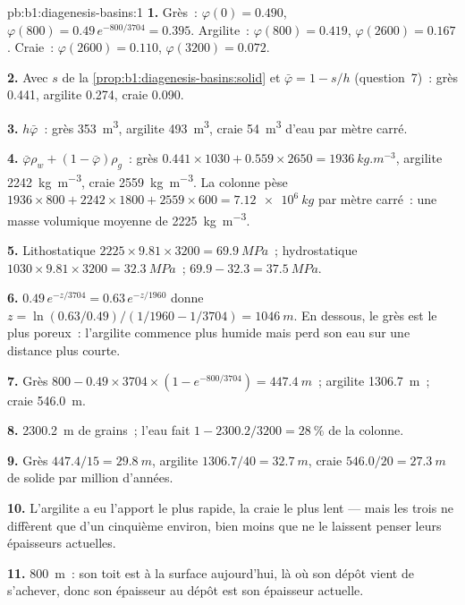 \begin{solution}{pb:b1:diagenesis-basins:1}
\textbf{1.} Grès~: $\varphi(0) = \num{0.490}$, $\varphi(800) =
0.49\,e^{-800/3704} = \num{0.395}$. Argilite~: $\varphi(800) = \num{0.419}$,
$\varphi(2600) = \num{0.167}$. Craie~: $\varphi(2600) = \num{0.110}$,
$\varphi(3200) = \num{0.072}$.

\textbf{2.} Avec $s$ de la \cref{prop:b1:diagenesis-basins:solid} et $\bar\varphi
= 1 - s/h$ (question~7)~: grès \num{0.441}, argilite \num{0.274}, craie
\num{0.090}.

\textbf{3.} $h\bar\varphi$~: grès \qty{353}{m^3}, argilite \qty{493}{m^3}, craie
\qty{54}{m^3} d'eau par mètre carré.

\textbf{4.} $\bar\varphi\rho_w + (1 - \bar\varphi)\rho_g$~: grès
$0.441\times1030 + 0.559\times2650 = \qty{1936}{kg.m^{-3}}$, argilite
\qty{2242}{kg.m^{-3}}, craie \qty{2559}{kg.m^{-3}}. La colonne pèse
$1936\times800 + 2242\times1800 + 2559\times600 = \qty{7.12e6}{kg}$ par mètre
carré~: une masse volumique moyenne de \qty{2225}{kg.m^{-3}}.

\textbf{5.} Lithostatique $2225\times9.81\times3200 = \qty{69.9}{MPa}$~; hydrostatique
$1030\times9.81\times3200 = \qty{32.3}{MPa}$~; 
$69.9 - 32.3 = \qty{37.5}{MPa}$.

\textbf{6.} $0.49\,e^{-z/3704} = 0.63\,e^{-z/1960}$ donne $z = \ln(0.63/0.49)
/(1/1960 - 1/3704) = \qty{1046}{m}$. En dessous, le grès est le plus poreux~:
l'argilite commence plus humide mais perd son eau sur une distance plus courte.

\textbf{7.} Grès $800 - 0.49\times3704\times(1 - e^{-800/3704}) =
\qty{447.4}{m}$~; argilite \qty{1306.7}{m}~; craie \qty{546.0}{m}.

\textbf{8.} \qty{2300.2}{m} de grains~; l'eau fait $1 - 2300.2/3200 =
\qty{28}{\%}$ de la colonne.

\textbf{9.} Grès $447.4/15 = \qty{29.8}{m}$, argilite $1306.7/40 =
\qty{32.7}{m}$, craie $546.0/20 = \qty{27.3}{m}$ de solide par million d'années.

\textbf{10.} L'argilite a eu l'apport le plus rapide, la craie le plus lent --- mais les
trois ne diffèrent que d'un cinquième environ, bien moins que ne le laissent penser leurs
épaisseurs actuelles.

\textbf{11.} \qty{800}{m}~: son toit est à la surface aujourd'hui, là où son dépôt
vient de s'achever, donc son épaisseur au dépôt est son épaisseur actuelle.


\end{solution}
